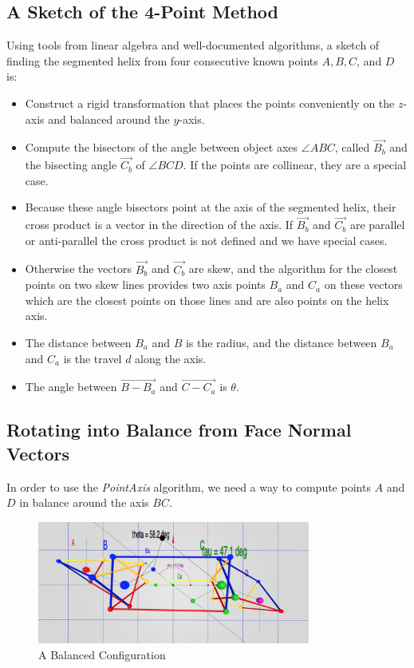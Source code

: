 \documentclass[11pt]{article}
\begin{document}
{\subsection{A Sketch of the 4-Point Method}

Using tools from linear algebra and well-documented algorithms, a sketch of finding the segmented helix from
four consecutive known points $A,B,C$, and $D$ is:
\begin{itemize}
\item Construct a rigid transformation that places the points conveniently on the $z$-axis and balanced
  around the $y$-axis.
\item Compute the bisectors of the angle between object axes $ \angle{ABC}$, called $\overrightarrow{B_b}$ and the
  bisecting angle $\overrightarrow{C_b}$ of $\angle{BCD}$.
  If the points are collinear, they are a special case.
\item Because these angle bisectors point at the axis of the segmented helix, their cross product is a vector
  in the direction of the axis. If $\overrightarrow{B_b}$ and $\overrightarrow{C_b}$ are parallel or anti-parallel the cross product is not defined
  and we have special cases.
\item  Otherwise the vectors $\overrightarrow{B_b}$ and $\overrightarrow{C_b}$ are skew, and the algorithm for the closest points on
  two skew lines provides two axis points $B_a$ and $C_a$ on these vectors which
  are the closest points on those lines and are also points on the helix axis.
\item The distance between $B_a$ and $B$ is the radius, and the distance between $B_a$ and $C_a$ is the travel $d$ along the axis.
  \item The angle between $\overrightarrow{B - B_a}$ and $\overrightarrow{C - C_a}$ is $\theta$.
\end{itemize}

\subsection{Rotating into Balance from Face Normal Vectors}

\label{sec:balance}



In order to use the {\em PointAxis} algorithm, we need a way
to compute points $A$ and $D$ in balance around the axis $BC$.

\begin{figure}
     \centering
     \includegraphics[width=0.80\textwidth]{figures/Balance.png}
     \caption{A Balanced Configuration}
  \label{fig:balancediagram}
\end{figure}


}
\end{document}
